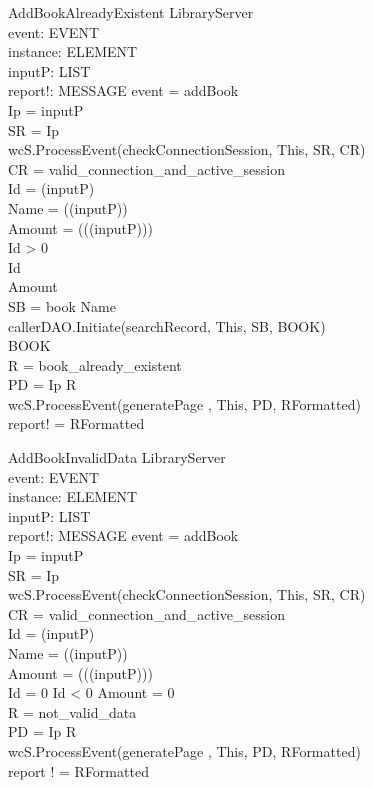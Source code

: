\begin{schema}{AddBookAlreadyExistent}
\Delta LibraryServer \\
event: EVENT \\
instance: ELEMENT \\
inputP: LIST \\
report!: MESSAGE
\where event = addBook \\
Ip = \head inputP \\
SR = \lseq Ip \rseq \\ 
wcS.ProcessEvent(checkConnectionSession, This, SR, CR) \\
CR = valid\_connection\_and\_active\_session \\
Id = \head (\tail inputP) \\
Name = \head (\tail (\tail inputP)) \\
Amount = \head (\tail (\tail (\tail inputP))) \\
Id > 0 \\
Id  \\
Amount  \\
SB = \lseq book Name \rseq \\
callerDAO.Initiate(searchRecord, This, SB, BOOK) \\
BOOK \neq \emptyset \\
R = book\_already\_existent \\ 
PD = \lseq Ip R \rseq \\
wcS.ProcessEvent(generatePage , This, PD, RFormatted) \\
report! = RFormatted
\end{schema}

\begin{schema}{AddBookInvalidData}
\Delta LibraryServer \\
event: EVENT \\
instance: ELEMENT \\
inputP: LIST \\
report!: MESSAGE
\where event = addBook \\
Ip = \head inputP \\
SR = \lseq Ip \rseq \\ 
wcS.ProcessEvent(checkConnectionSession, This, SR, CR) \\
CR = valid\_connection\_and\_active\_session \\
Id = \head (\tail inputP) \\
Name = \head (\tail (\tail inputP)) \\
Amount = \head (\tail (\tail (\tail inputP))) \\
Id = 0 \lor Id < 0 \lor Amount = 0 \\
R = not\_valid\_data \\
PD = \lseq Ip R \rseq \\
wcS.ProcessEvent(generatePage , This, PD, RFormatted) \\
report ! = RFormatted
\end{schema}

